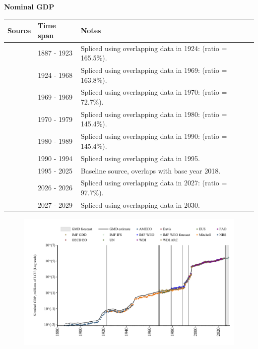 \documentclass[12pt,a4paper,landscape]{article}
\begin{document}
\begin{adjustbox}{max totalsize={\paperwidth}{\paperheight},center}
\begin{minipage}[t][\textheight][t]{\textwidth}
\vspace*{0.5cm}
{}
\begin{center}
{\Large\bfseries Nominal GDP}
\end{center}
\vspace{0.5cm}
\begin{table}[H]
\centering
\small
\begin{tabular}{|l|l|l|}
\hline
\textbf{Source} & \textbf{Time span} & \textbf{Notes} \\
\hline
\rowcolor{white}\cite{NBS}& 1887 - 1923 &Spliced using overlapping data in 1924: (ratio = 165.5\%). \\
\rowcolor{lightgray}\cite{Mitchell}& 1924 - 1968 &Spliced using overlapping data in 1969: (ratio = 163.8\%). \\
\rowcolor{white}\cite{IMF_GDD}& 1969 - 1969 &Spliced using overlapping data in 1970: (ratio = 72.7\%). \\
\rowcolor{lightgray}\cite{UN}& 1970 - 1979 &Spliced using overlapping data in 1980: (ratio = 145.4\%). \\
\rowcolor{white}\cite{WDI}& 1980 - 1989 &Spliced using overlapping data in 1990: (ratio = 145.4\%). \\
\rowcolor{lightgray}\cite{AMECO}& 1990 - 1994 &Spliced using overlapping data in 1995. \\
\rowcolor{white}\cite{OECD_EO}& 1995 - 2025 &Baseline source, overlaps with base year 2018. \\
\rowcolor{lightgray}\cite{AMECO}& 2026 - 2026 &Spliced using overlapping data in 2027: (ratio = 97.7\%). \\
\rowcolor{white}\cite{IMF_WEO_forecast}& 2027 - 2029 &Spliced using overlapping data in 2030. \\
\hline
\end{tabular}
\end{table}
\begin{figure}[H]
\centering
\includegraphics[width=\textwidth,height=0.6\textheight,keepaspectratio]{graphs/BGR_nGDP.pdf}
\end{figure}
\end{minipage}
\end{adjustbox}
\end{document}

